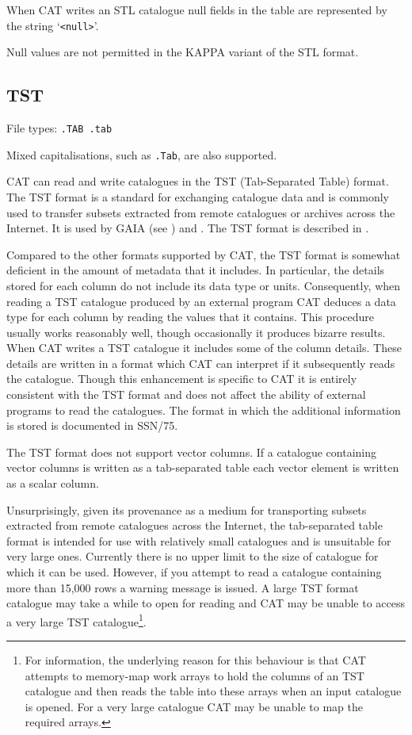 \documentclass[11pt,twoside]{starlink}
\begin{document}
When CAT writes an STL catalogue null fields in the table are
represented by the string `\verb-<null>-'.

Null values are not permitted in the KAPPA variant of the STL format.


\subsection{TST}

File types: \texttt{.TAB  .tab}

Mixed capitalisations, such as \texttt{.Tab}, are also supported.

CAT can read and write catalogues in the TST (Tab-Separated Table)
format.  The TST format is a standard for exchanging catalogue data
and is commonly used to transfer subsets extracted from remote catalogues
or archives across the Internet.  It is used by GAIA (see
\cite{SUN214}) and
.
The TST format is described in
\cite{SSN75}.

Compared to the other formats supported by CAT, the TST format is
somewhat deficient in the amount of metadata that it includes.  In
particular, the details stored for each column do not include its data
type or units.  Consequently, when reading a TST catalogue produced by
an external program CAT deduces a data type for each column by reading
the values that it contains.  This procedure usually works reasonably
well, though occasionally it produces bizarre results.  When CAT writes
a TST catalogue it includes some of the column details.  These details
are written in a format which CAT can interpret if it subsequently
reads the catalogue.  Though this enhancement is specific to CAT it is
entirely consistent with the TST format and does not affect the ability
of external programs to read the catalogues.  The format in which the
additional information is stored is documented in SSN/75.

The TST format does not support vector columns.  If a catalogue
containing vector columns is written as a tab-separated table each vector
element is written as a scalar column.

Unsurprisingly, given its provenance as a medium for transporting
subsets extracted from remote catalogues across the Internet, the
tab-separated table format is intended for use with relatively small
catalogues and is unsuitable for very large ones.  Currently there is no
upper limit to the size of catalogue for which it can be used.  However,
if you attempt to read a catalogue containing more than 15,000 rows a
warning message is issued.  A large TST format catalogue may take a while
to open for reading and CAT may be unable to access a very large TST
catalogue\footnote{For information, the underlying reason for this
behaviour is that CAT attempts to memory-map work arrays to hold the
columns of an TST catalogue and then reads the table into these arrays
when an input catalogue is opened.  For a very large catalogue CAT may
be unable to map the required arrays.}.
\end{document}
